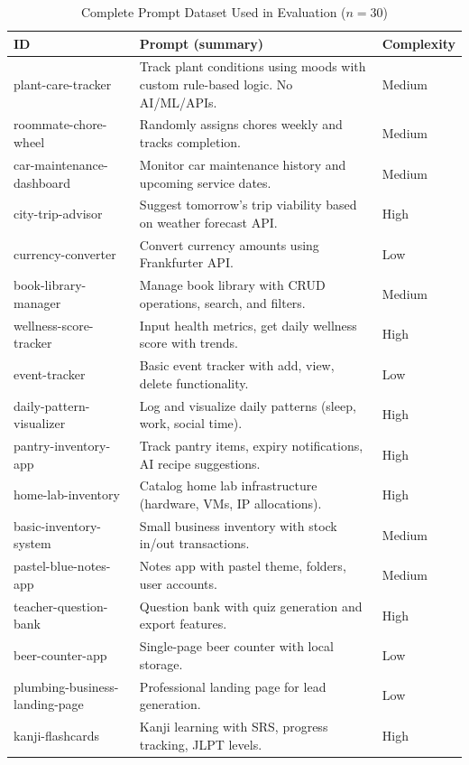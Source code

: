 \documentclass[conference]{IEEEtran}
\begin{document}
\begin{table}[h!]
\caption{Complete Prompt Dataset Used in Evaluation ($n=30$)}
\label{tab:prompt-dataset}
\centering
\footnotesize
\begin{tabular}{@{}p{4cm}p{10cm}p{2cm}@{}}
\toprule
\textbf{ID} & \textbf{Prompt (summary)} & \textbf{Complexity} \\
\midrule
plant-care-tracker & Track plant conditions using moods with custom rule-based logic. No AI/ML/APIs. & Medium \\
roommate-chore-wheel & Randomly assigns chores weekly and tracks completion. & Medium \\
car-maintenance-dashboard & Monitor car maintenance history and upcoming service dates. & Medium \\
city-trip-advisor & Suggest tomorrow's trip viability based on weather forecast API. & High \\
currency-converter & Convert currency amounts using Frankfurter API. & Low \\
book-library-manager & Manage book library with CRUD operations, search, and filters. & Medium \\
wellness-score-tracker & Input health metrics, get daily wellness score with trends. & High \\
event-tracker & Basic event tracker with add, view, delete functionality. & Low \\
daily-pattern-visualizer & Log and visualize daily patterns (sleep, work, social time). & High \\
pantry-inventory-app & Track pantry items, expiry notifications, AI recipe suggestions. & High \\
home-lab-inventory & Catalog home lab infrastructure (hardware, VMs, IP allocations). & High \\
basic-inventory-system & Small business inventory with stock in/out transactions. & Medium \\
pastel-blue-notes-app & Notes app with pastel theme, folders, user accounts. & Medium \\
teacher-question-bank & Question bank with quiz generation and export features. & High \\
beer-counter-app & Single-page beer counter with local storage. & Low \\
plumbing-business-landing-page & Professional landing page for lead generation. & Low \\
kanji-flashcards & Kanji learning with SRS, progress tracking, JLPT levels. & High \\

\end{tabular}
\end{table}
\end{document}
